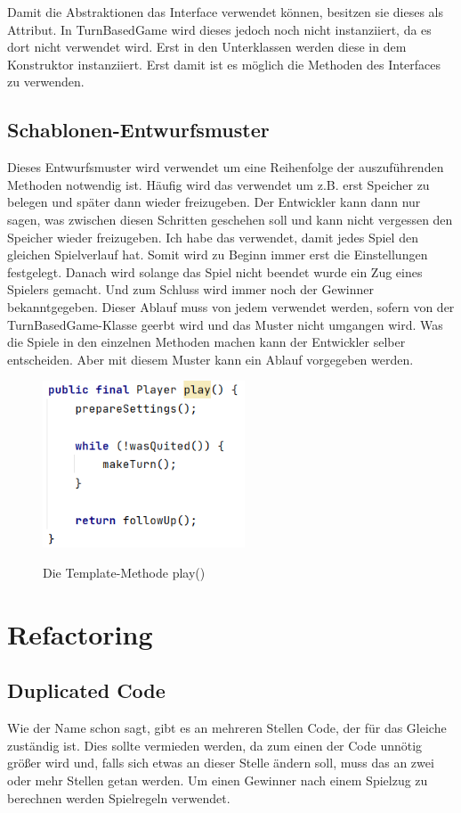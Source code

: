 \documentclass[12pt]{article}
\begin{document}
Damit die Abstraktionen das Interface verwendet können, besitzen sie dieses als Attribut. In TurnBasedGame wird dieses jedoch noch nicht instanziiert, da es dort nicht verwendet wird. Erst in den Unterklassen werden diese in dem Konstruktor instanziiert. Erst damit ist es möglich die Methoden des Interfaces zu verwenden.



\subsection{Schablonen-Entwurfsmuster}
Dieses Entwurfsmuster wird verwendet um eine Reihenfolge der auszuführenden Methoden notwendig ist. Häufig wird das verwendet um z.B. erst Speicher zu belegen und später dann wieder freizugeben. Der Entwickler kann dann nur sagen, was zwischen diesen Schritten geschehen soll und kann nicht vergessen den Speicher wieder freizugeben. 
Ich habe das verwendet, damit jedes Spiel den gleichen Spielverlauf hat. Somit wird zu Beginn immer erst die Einstellungen festgelegt. Danach wird solange das Spiel nicht beendet wurde ein Zug eines Spielers gemacht. Und zum Schluss wird immer noch der Gewinner bekanntgegeben. Dieser Ablauf muss von jedem verwendet werden, sofern von der TurnBasedGame-Klasse geerbt wird und das Muster nicht umgangen wird. Was die Spiele in den einzelnen Methoden machen kann der Entwickler selber entscheiden. Aber mit diesem Muster kann ein Ablauf vorgegeben werden.

\begin{figure}[H]
\centering
{\includegraphics[width=6cm]{Bilder/templatePattern}}
\caption{Die Template-Methode play()}
\label{fig:templatePattern}
\end{figure}




\newpage
\section{Refactoring}


\subsection{Duplicated Code}
Wie der Name schon sagt, gibt es an mehreren Stellen Code, der für das Gleiche zuständig ist. Dies sollte vermieden werden, da zum einen der Code unnötig größer wird und, falls sich etwas an dieser Stelle ändern soll, muss das an zwei oder mehr Stellen getan werden. Um einen Gewinner nach einem Spielzug zu berechnen werden Spielregeln verwendet.
\end{document}
